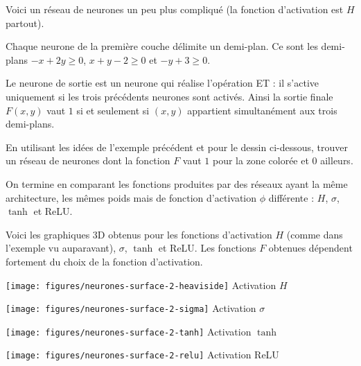 \documentclass[11pt,class=report,crop=false]{standalone}
\begin{document}
\begin{exemple}
Voici un réseau de neurones un peu plus compliqué (la fonction d'activation est $H$ partout). 

Chaque neurone de la première couche délimite un demi-plan. Ce sont les demi-plans $-x+2y\ge0$, $x+y-2\ge0$ et $-y+3\ge0$.

Le neurone de sortie est un neurone qui réalise l'opération \og{}ET\fg{} : il s'active uniquement si les trois précédents neurones sont activés.
Ainsi la sortie finale $F(x,y)$ vaut $1$ si et seulement si $(x,y)$ appartient simultanément aux trois demi-plans.


\end{exemple}

\begin{exercicecours}
En utilisant les idées de l'exemple précédent et pour le dessin ci-dessous, trouver un réseau de neurones dont la fonction $F$ vaut $1$ pour la zone colorée et $0$ ailleurs.



\end{exercicecours}


\begin{exemple}
On termine en comparant les fonctions produites par des réseaux ayant la même architecture, les mêmes poids mais de fonction d'activation $\phi$ différente : $H$, $\sigma$, $\tanh$ et ReLU.


Voici les graphiques 3D obtenus pour les fonctions d'activation $H$ (comme dans l'exemple vu auparavant), $\sigma$, $\tanh$ et ReLU. Les fonctions $F$ obtenues dépendent fortement du choix de la fonction d'activation.

\begin{center}
\begin{minipage}{0.4\textwidth}
\center
\texttt{[image: figures/neurones-surface-2-heaviside]}
Activation $H$
\end{minipage}\quad
\begin{minipage}{0.4\textwidth}
\center
\texttt{[image: figures/neurones-surface-2-sigma]}
Activation $\sigma$
\end{minipage}
\end{center}

\begin{center}
\begin{minipage}{0.4\textwidth}
\center
\texttt{[image: figures/neurones-surface-2-tanh]}
Activation $\tanh$
\end{minipage}\quad
\begin{minipage}{0.4\textwidth}
\center
\texttt{[image: figures/neurones-surface-2-relu]}
Activation ReLU
\end{minipage}
\end{center}
\end{exemple}
\end{document}
